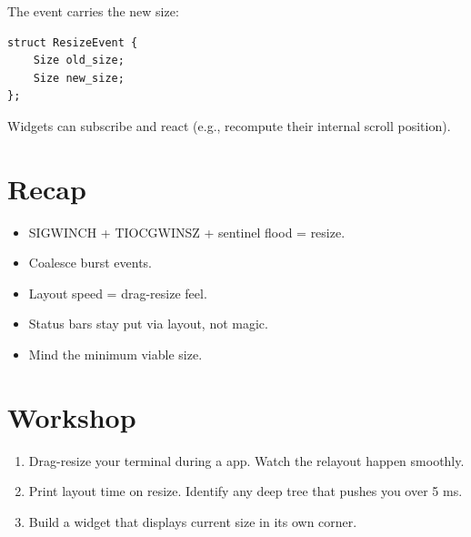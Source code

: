 The event carries the new size:

\begin{lstlisting}
struct ResizeEvent {
    Size old_size;
    Size new_size;
};
\end{lstlisting}

Widgets can subscribe and react (e.g., recompute their
internal scroll position).

\section{Recap}

\begin{recap}
\begin{itemize}[leftmargin=*]
  \item SIGWINCH + TIOCGWINSZ + sentinel flood = resize.
  \item Coalesce burst events.
  \item Layout speed = drag-resize feel.
  \item Status bars stay put via layout, not magic.
  \item Mind the minimum viable size.
\end{itemize}
\end{recap}

\section*{Workshop}

\begin{enumerate}[leftmargin=*]
  \item Drag-resize your terminal during a \maya{} app.
    Watch the relayout happen smoothly.
  \item Print layout time on resize. Identify any deep
    tree that pushes you over 5 ms.
  \item Build a widget that displays current size in its
    own corner.
\end{enumerate}
